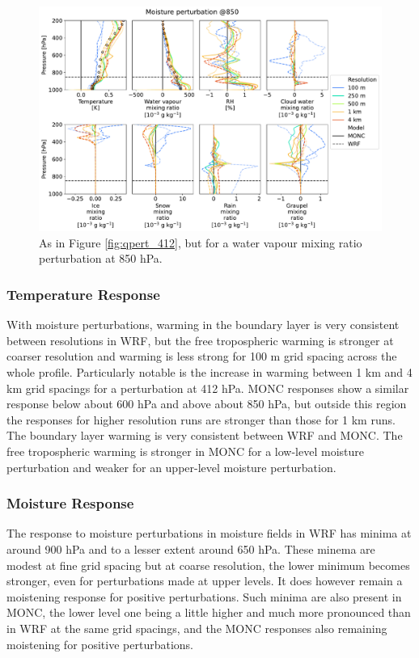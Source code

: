 \documentclass[draft]{agujournal2019}
\begin{document}
\begin{figure}[pth]
    \noindent\includegraphics[width=\textwidth]{figures/pert_diffs_q_0.0002_@850}
    \caption{As in Figure \ref{fig:qpert_412}, but for a water vapour mixing
    ratio perturbation at 850 hPa.}
    \label{fig:qpert_850}
\end{figure}

\subsubsection{Temperature Response}

With moisture perturbations, warming in the boundary layer is very consistent
between resolutions in WRF, but the free tropospheric warming is stronger at
coarser resolution and warming is less strong for 100 m grid spacing across the
whole profile. Particularly notable is the increase in warming between 1 km and
4 km grid spacings for a perturbation at 412 hPa. MONC responses show a similar
response below about 600 hPa and above about 850 hPa, but outside this region
the responses for higher resolution runs are stronger than those for 1 km runs.
The boundary layer warming is very consistent between WRF and MONC. The free
tropospheric warming is stronger in MONC for a low-level moisture perturbation
and weaker for an upper-level moisture perturbation.

\subsubsection{Moisture Response}

The response to moisture perturbations in moisture fields in WRF has minima at
around 900 hPa and to a lesser extent around 650 hPa. These minema are modest at
fine grid spacing but at coarse resolution, the lower minimum becomes stronger,
even for perturbations made at upper levels. It does however remain a moistening
response for positive perturbations. Such minima are also present in MONC, the
lower level one being a little higher and much more pronounced than in WRF at
the same grid spacings, and the MONC responses also remaining moistening for
positive perturbations.
\end{document}
